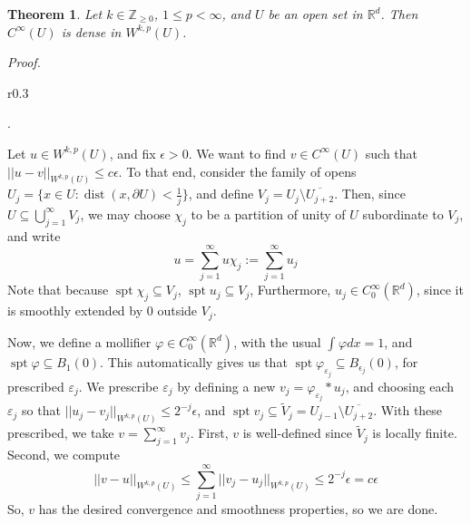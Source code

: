 \documentclass[letterpaper,10pt]{article}
\newcommand{\wkp}{W^{k,p}}
\DeclareMathOperator{\spt}{spt}
\DeclareMathOperator{\dist}{dist}
\theoremstyle{definition}
\theoremstyle{remark}
\theoremstyle{plain}
\newtheorem{thm}{Theorem}[section]
\renewenvironment{proof}{
    \vspace{5pt}
    \begin{mdframed}[bottomline=false,topline=false,rightline=false, skipabove=0]
    \noindent\textit{Proof.}}
{
    \hspace{\fill}\qedsymbol
    \end{mdframed}
}
\begin{document}
\begin{thm}\label{thm:density2}
    Let $k\in\mathbb Z_{\geq 0}$, $1\leq p<\infty$, and $U$ be an open set
    in $\mathbb R^d$. Then $C^\infty(U)$ is dense in $\wkp(U)$.
\end{thm}
\begin{proof}
    \begin{wrapfigure}{r}{0.3\textwidth}
        \centering
        \caption{$U_j$ and $V_j$ in the proof of Theorem \ref{thm:density2}}.
        \label{fig:density2}
    \end{wrapfigure}
    Let $u\in\wkp(U)$, and fix $\epsilon>0$.
    We want to find $v\in C^\infty(U)$ such that $||u-v||_{\wkp(U)}\leq c\epsilon$.
    To that end, consider the family of opens 
    $U_j=\{x\in U:\dist(x,\partial U)<\frac{1}{j}\}$,
    and define $V_j=U_j\setminus\overline{U_{j+2}}$.
    Then, since $U\subseteq\bigcup_{j=1}^\infty V_j$, we may choose $\chi_j$
    to be a partition of unity of $U$ subordinate to $V_j$,
    and write 
    $$
    u=\sum_{j=1}^{\infty}u\chi_j:=\sum_{j=1}^{\infty}u_j
    $$
    Note that because $\spt\chi_j\subseteq V_j$, $\spt u_j\subseteq V_j$,
    Furthermore, $u_j\in C^\infty_0(\mathbb R^d)$, since it is smoothly extended
    by $0$ outside $V_j$.

    Now, we define a mollifier $\varphi \in C_0^\infty(\mathbb R^d)$,
    with the usual $\int_{}^{}\varphi dx=1$, and $\spt\varphi\subseteq B_1(0)$.
    This automatically gives us that $\spt\varphi_{\varepsilon_j}\subseteq B_{\epsilon_j}(0)$,
    for prescribed $\varepsilon_j$.
    We prescribe $\varepsilon_j$ by defining a new $v_j=\varphi_{\varepsilon_j}*u_j$,
    and choosing each $\varepsilon_j$ so that 
    $||u_j-v_j||_{\wkp(U)}\leq 2^{-j}\epsilon$, and 
    $\spt v_j\subseteq\tilde V_j=U_{j-1}\setminus\overline{U_{j+2}}$.
    With these prescribed, we take $v=\sum_{j=1}^{\infty}v_j$.
    First, $v$ is well-defined since $\tilde V_j$ is locally finite.
    Second, we compute
    $$
        ||v-u||_{\wkp(U)}\leq\sum_{j=1}^{\infty}||v_j-u_j||_{\wkp(U)}
        \leq 2^{-j}\epsilon=c\epsilon
    $$
    So, $v$ has the desired convergence and smoothness properties, so we are done.
\end{proof}
\end{document}
